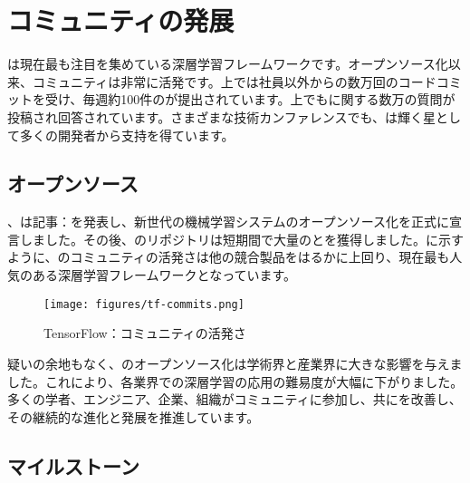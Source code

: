 \begin{content}
\end{content}

\section{コミュニティの発展}

\begin{content}

\tf{}は現在最も注目を集めている深層学習フレームワークです。オープンソース化以来、\tf{}コミュニティは非常に活発です。上では社員以外からの数万回のコードコミットを受け、毎週約100件のが提出されています。上でも\tf{}に関する数万の質問が投稿され回答されています。さまざまな技術カンファレンスでも、\tf{}は輝く星として多くの開発者から支持を得ています。

\subsection{オープンソース}

、は記事：を発表し、新世代の機械学習システムのオープンソース化を正式に宣言しました。その後、のリポジトリは短期間で大量のとを獲得しました。に示すように、のコミュニティの活発さは他の競合製品をはるかに上回り、現在最も人気のある深層学習フレームワークとなっています。

\begin{figure}[H]
\centering
\texttt{[image: figures/tf-commits.png]}
\caption{TensorFlow：コミュニティの活発さ}
 \label{fig:tf-commits}
\end{figure}

疑いの余地もなく、のオープンソース化は学術界と産業界に大きな影響を与えました。これにより、各業界での深層学習の応用の難易度が大幅に下がりました。多くの学者、エンジニア、企業、組織がコミュニティに参加し、共にを改善し、その継続的な進化と発展を推進しています。

\subsection{マイルストーン}


\end{content}

